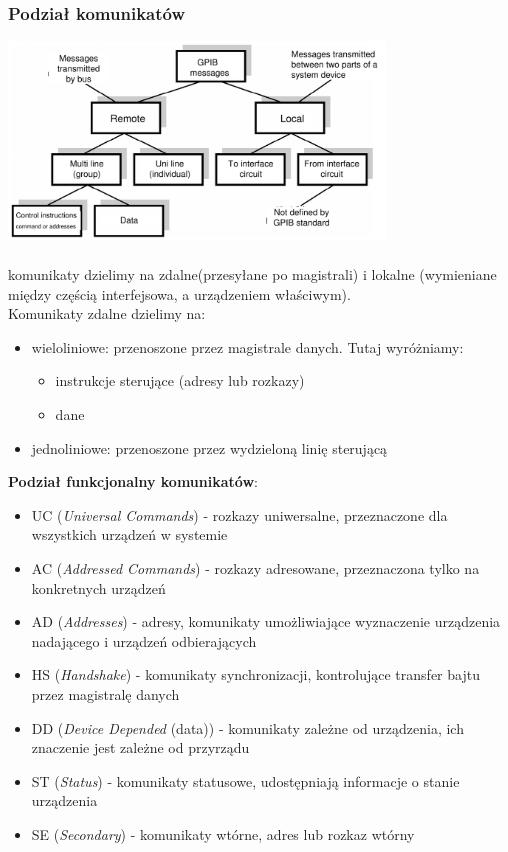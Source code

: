 \subsubsection{Podział komunikatów}
\includegraphics[width=10cm]{./wyklady/IEEE488_SCPI_8_1.pdf}\\\\
komunikaty dzielimy na zdalne(przesyłane po magistrali)  i lokalne (wymieniane między częścią interfejsowa, a urządzeniem właściwym).\\
Komunikaty zdalne dzielimy na:
\begin{itemize}
	\item wieloliniowe: przenoszone przez magistrale danych. Tutaj wyróżniamy:
	\begin{itemize}
		\item instrukcje sterujące (adresy lub rozkazy)
		\item dane
	\end{itemize}
	\item jednoliniowe: przenoszone przez wydzieloną linię sterującą
\end{itemize}

\textbf{Podział funkcjonalny komunikatów}:
\begin{itemize}
	\item UC (\emph{Universal Commands}) - rozkazy uniwersalne, przeznaczone dla wszystkich urządzeń w systemie
	\item AC (\emph{Addressed Commands}) - rozkazy adresowane, przeznaczona tylko na konkretnych urządzeń
	\item AD (\emph{Addresses}) - adresy, komunikaty umożliwiające wyznaczenie urządzenia nadającego i urządzeń odbierających
	\item HS (\emph{Handshake}) - komunikaty synchronizacji, kontrolujące transfer bajtu przez magistralę danych
	\item DD (\emph{Device Depended} (data)) - komunikaty zależne od urządzenia, ich znaczenie jest zależne od przyrządu
	\item ST (\emph{Status}) - komunikaty statusowe, udostępniają informacje o stanie urządzenia
	\item SE (\emph{Secondary}) - komunikaty wtórne, adres lub rozkaz wtórny
\end{itemize}

